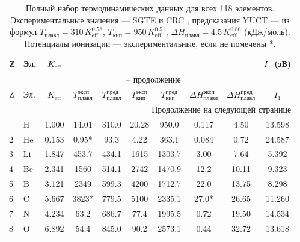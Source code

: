 \documentclass[12pt,a4paper]{article}
\theoremstyle{remark}
\begin{document}
	\setlength{\tabcolsep}{3pt}
	\begin{longtable}{@{}llcccccccc@{}}
		\caption{Полный набор термодинамических данных для всех 118 элементов.  
			Экспериментальные значения — SGTE \cite{Dinsdale1991} и CRC \cite{CRC};  
			предсказания YUCT — из формул \(T_{\text{плавл}} = 310\,K_{\mathrm{eff}}^{0.58}\),  
			\(T_{\text{кип}} = 950\,K_{\mathrm{eff}}^{0.51}\),  
			\(\Delta H_{\text{плавл}} = 4.5\,K_{\mathrm{eff}}^{0.86}\) (кДж/моль).  
			Потенциалы ионизации — экспериментальные, если не помечены *.}
		\label{tab:full_118}\\
		\toprule
		Z & Эл. & \(K_{\mathrm{eff}}\) & 
		\makebox[1.5cm]{\(T_{\text{плавл}}^{\text{эксп}}\) (K)} & 
		\makebox[1.5cm]{\(T_{\text{плавл}}^{\text{пред}}\) (K)} &
		\makebox[1.5cm]{\(T_{\text{кип}}^{\text{эксп}}\) (K)} & 
		\makebox[1.5cm]{\(T_{\text{кип}}^{\text{пред}}\) (K)} &
		\makebox[1.5cm]{\(\Delta H_{\text{плавл}}^{\text{эксп}}\) (кДж/моль)} & 
		\makebox[1.5cm]{\(\Delta H_{\text{плавл}}^{\text{пред}}\) (кДж/моль)} &
		\(I_1\) (эВ) \\
		\midrule
		\endfirsthead
		\multicolumn{10}{c}{\tablename\ \thetable{} -- продолжение} \\
		\toprule
		Z & Эл. & \(K_{\mathrm{eff}}\) & \(T_{\text{плавл}}^{\text{эксп}}\) & \(T_{\text{плавл}}^{\text{пред}}\) &
		\(T_{\text{кип}}^{\text{эксп}}\) & \(T_{\text{кип}}^{\text{пред}}\) & \(\Delta H_{\text{плавл}}^{\text{эксп}}\) & \(\Delta H_{\text{плавл}}^{\text{пред}}\) & \(I_1\) \\
		\midrule
		\endhead
		\bottomrule
		\multicolumn{10}{r}{Продолжение на следующей странице} \\
		\endfoot
		\endlastfoot
		1  & H   & 1.000 & 14.01  & 310.0  & 20.28  & 950.0  & 0.117 & 4.50  & 13.598 \\
		2  & He  & 0.153 & 0.95*  & 93.3   & 4.22   & 363.1  & 0.084 & 0.72  & 24.587 \\
		3  & Li  & 1.847 & 453.7  & 434.1  & 1615   & 1303.7 & 3.00  & 7.64  & 5.392 \\
		4  & Be  & 2.341 & 1560   & 514.1  & 2742   & 1470.9 & 12.2  & 10.11 & 9.323 \\
		5  & B   & 3.121 & 2349   & 599.3  & 4200   & 1712.7 & 22.0  & 13.75 & 8.298 \\
		6  & C   & 5.667 & 3823*  & 779.5  & 5100   & 2335.1 & 27.0* & 26.65 & 11.260 \\
		7  & N   & 4.234 & 63.2   & 686.7  & 77.4   & 1995.5 & 0.72  & 19.50 & 14.534 \\
		8  & O   & 6.892 & 54.4   & 845.0  & 90.2   & 2573.1 & 0.44  & 32.72 & 13.618 \\

\end{longtable}
\end{document}
